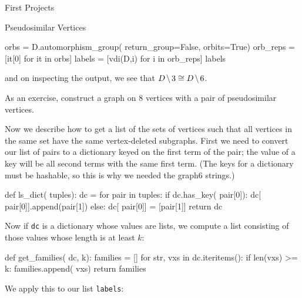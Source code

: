 \begin{chap}{First Projects}
\begin{sect}{Pseudosimilar Vertices}
\begin{sagecode}
\begin{sageinput}
orbs = D.automorphism_group( return_group=False, orbits=True)
orb_reps = [it[0] for it in orbs]
labels = [vdi(D,i) for i in orb_reps]
labels
\end{sageinput}
\begin{sageoutput}
\end{sageoutput}
\end{sagecode}
%
\begin{para}
and on inspecting the output, we see that $D\mathbin{\mkern-1.5mu\setminus\mkern-1.5mu} 3\cong D\mathbin{\mkern-1.5mu\setminus\mkern-1.5mu} 6$.
\end{para}
%
\begin{para}
As an exercise, construct a graph on 8 vertices with a pair of pseudosimilar
vertices.
\end{para}
%
\begin{para}
Now we describe how to get a list of the sets of vertices such that all
vertices in the same set have the same vertex-deleted subgraphs.
First we need to convert our list of pairs to a dictionary keyed on the 
first term of the pair; the value of a key will be all second terms 
with the same first term. (The keys for a dictionary must be hashable, so this
is why we needed the graph6 strings.)
\end{para}
%
\begin{sagecode}
\begin{sageinput}
def ls_dict( tuples):
    dc = {} 
    for pair in tuples:
        if dc.has_key( pair[0]):
            dc[ pair[0]].append(pair[1])
        else:
            dc[ pair[0]] = [pair[1]]
    return dc
\end{sageinput}
\end{sagecode}
%
\begin{para}
Now if \verb|dc| is a dictionary whose values are lists, we compute a list consisting
of those values whose length is at least $k$:
\end{para}
%
\begin{sagecode}
\begin{sageinput}
def get_families( dc, k):
    families = []
    for str, vxs in dc.iteritems():
        if len(vxs) >= k:
            families.append( vxs)
    return families
\end{sageinput}
\end{sagecode}
%
\begin{para}
We apply this to our list \texttt{labels}:

\end{para}
\end{sect}
\end{chap}
